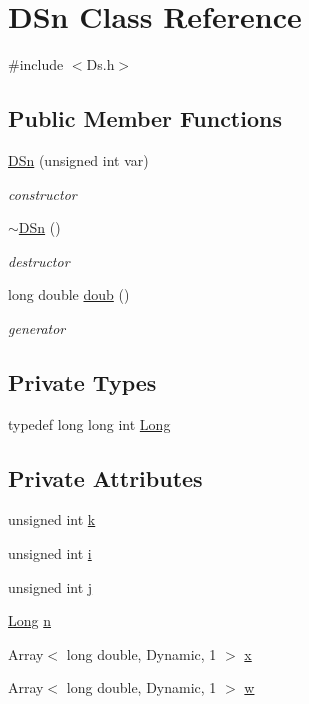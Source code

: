 \hypertarget{class_d_sn}{\section{D\-Sn Class Reference}
\label{class_d_sn}
}


{\ttfamily \#include $<$Ds.\-h$>$}

\subsection*{Public Member Functions}
\begin{DoxyCompactItemize}
\item 
\hyperlink{class_d_sn_a4a66c98d5549b813ac109acd4cc3f983}{D\-Sn} (unsigned int var)
\begin{DoxyCompactList}\small\item\em constructor \end{DoxyCompactList}\item 
\hyperlink{class_d_sn_a66a3e9fdb7012e1d33249ee4921bde0d}{$\sim$\-D\-Sn} ()
\begin{DoxyCompactList}\small\item\em destructor \end{DoxyCompactList}\item 
long double \hyperlink{class_d_sn_a8942a2f389be84ea2abe993c5e1477b8}{doub} ()
\begin{DoxyCompactList}\small\item\em generator \end{DoxyCompactList}\end{DoxyCompactItemize}
\subsection*{Private Types}
\begin{DoxyCompactItemize}
\item 
typedef long long int \hyperlink{class_d_sn_a5363392c0144d0b1099b36cf04c531d4}{Long}
\end{DoxyCompactItemize}
\subsection*{Private Attributes}
\begin{DoxyCompactItemize}
\item 
unsigned int \hyperlink{class_d_sn_abbfbd2fec8d17081897e5cf755374149}{k}
\item 
unsigned int \hyperlink{class_d_sn_a205b8a78bdbeee3ed57ad7969ee7246e}{i}
\item 
unsigned int \hyperlink{class_d_sn_afe7eb12770bc91d87a1fe74ac2929b46}{j}
\item 
\hyperlink{class_d_sn_a5363392c0144d0b1099b36cf04c531d4}{Long} \hyperlink{class_d_sn_a9ff951d6dab4a24ba0296ea175b0962c}{n}
\item 
Array$<$ long double, Dynamic, 1 $>$ \hyperlink{class_d_sn_aa25ce8fbec334c9388d6a3592b8e1366}{x}
\item 
Array$<$ long double, Dynamic, 1 $>$ \hyperlink{class_d_sn_aebd6954764715ae6dfbb14a7d934b404}{w}
\end{DoxyCompactItemize}


